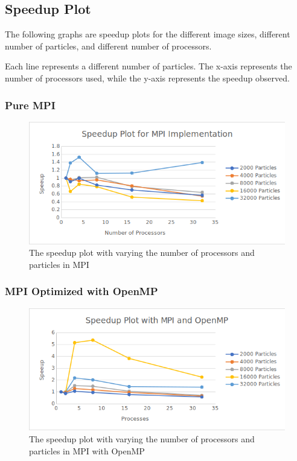 \documentclass{article}
\begin{document}
\subsection{Speedup Plot}
The following graphs are speedup plots for the different image sizes, different number of particles, and different number of processors.

Each line represents a different number of particles. The x-axis represents the number of processors used, while the y-axis represents the speedup observed.

\subsubsection{Pure MPI}
\begin{figure}[H]
	\begin{center}
		\hspace*{-0.5cm}                                                           
  		\includegraphics[scale=0.71]{Report_Assets/speedupmpi.png}
  	\end{center}
  	\caption{The speedup plot with varying the number of processors and particles in MPI}
\end{figure}

\subsubsection{MPI Optimized with OpenMP}
\begin{figure}[H]
	\begin{center}
		\hspace*{-0.5cm}                                                           
  		\includegraphics[scale=0.71]{Report_Assets/speedupomp.png}
  	\end{center}
  	\caption{The speedup plot with varying the number of processors and particles in MPI with OpenMP}
\end{figure}
\end{document}

